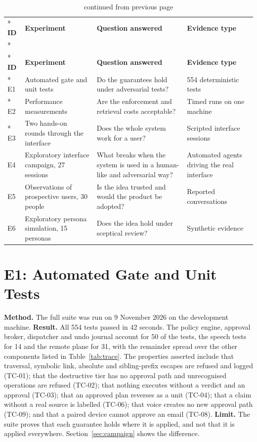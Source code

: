 \documentclass{FastFyp}
\begin{document}
{
\begin{longtable}{|p{0.9cm}|p{4.2cm}|p{4.3cm}|p{3.8cm}|}
\caption{The experiments reported in this chapter.}\label{tab:experiments}\\*
\hline
\textbf{ID} & \textbf{Experiment} & \textbf{Question answered} & \textbf{Evidence type} \\*
\hline
\endfirsthead
\caption[]{continued from previous page}\\*
\hline
\textbf{ID} & \textbf{Experiment} & \textbf{Question answered} & \textbf{Evidence type} \\*
\hline
\endhead
\hline
E1 & Automated gate and unit tests & Do the guarantees hold under adversarial tests? & 554 deterministic tests \\*
\hline
E2 & Performance measurements & Are the enforcement and retrieval costs acceptable? & Timed runs on one machine \\*
\hline
E3 & Two hands-on rounds through the interface & Does the whole system work for a user? & Scripted interface sessions \\
\hline
E4 & Exploratory interface campaign, 27 sessions & What breaks when the system is used in a human-like and adversarial way? & Automated agents driving the real interface \\
\hline
E5 & Observations of prospective users, 30 people & Is the idea trusted and would the product be adopted? & Reported conversations \\
\hline
E6 & Exploratory persona simulation, 15 personas & Does the idea hold under sceptical review? & Synthetic evidence \\
\hline
\end{longtable}
}

\section{E1: Automated Gate and Unit Tests}
\textbf{Method.} The full suite was run on 9 November 2026 on the development machine. \textbf{Result.} All 554 tests passed in 42 seconds. The policy engine, approval broker, dispatcher and undo journal account for 50 of the tests, the speech tests for 14 and the remote plane for 31, with the remainder spread over the other components listed in Table~\ref{tab:trace}. The properties asserted include that traversal, symbolic link, absolute and sibling-prefix escapes are refused and logged (TC-01); that the destructive tier has no approval path and unrecognised operations are refused (TC-02); that nothing executes without a verdict and an approval (TC-03); that an approved plan reverses as a unit (TC-04); that a claim without a real source is labelled (TC-06); that voice creates no new approval path (TC-09); and that a paired device cannot approve an email (TC-08). \textbf{Limit.} The suite proves that each guarantee holds where it is applied, and not that it is applied everywhere. Section~\ref{sec:campaign} shows the difference.
\end{document}
